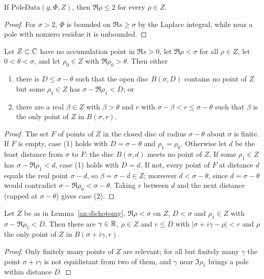 \begin{lemma}\label{an:pole-re-le}
If $\mathrm{PoleData}(g,\Phi,Z)$, then $\Re\rho\le2$ for every $\rho\in Z$.
\end{lemma}
\begin{proof}
For $\sigma>2$, $\Phi$ is bounded on $\Re s\ge\sigma$ by the Laplace
integral, while near a pole with nonzero residue it is unbounded.
\end{proof}

\begin{lemma}[Dichotomy]\label{an:dichotomy}
Let $Z\subset\mathbb{C}$ have no accumulation point in $\Re s>0$, let
$\Re\rho<\sigma$ for all $\rho\in Z$, let $0<\theta<\sigma$, and let
$\rho_0\in Z$ with $\Re\rho_0>\theta$. Then either
\begin{enumerate}
\item there is $D\le\sigma-\theta$ such that the open disc $B(\sigma,D)$
contains no point of $Z$ but some $\rho_1\in Z$ has $\sigma-\Re\rho_1<D$;
or
\item there are a real $\beta\in Z$ with $\beta>\theta$ and $r$ with
$\sigma-\beta<r\le\sigma-\theta$ such that $\beta$ is the only point of
$Z$ in $B(\sigma,r)$.
\end{enumerate}
\end{lemma}
\begin{proof}
The set $F$ of points of $Z$ in the closed disc of radius
$\sigma-\theta$ about $\sigma$ is finite. If $F$ is empty, case (1)
holds with $D=\sigma-\theta$ and $\rho_1=\rho_0$. Otherwise let $d$ be the
least distance from $\sigma$ to $F$; the disc $B(\sigma,d)$ meets no point
of $Z$. If some $\rho_1\in Z$ has $\sigma-\Re\rho_1<d$, case (1) holds
with $D=d$. If not, every point of $F$ at distance $d$ equals the real
point $\sigma-d$, so $\beta=\sigma-d\in Z$; moreover $d<\sigma-\theta$,
since $d=\sigma-\theta$ would contradict $\sigma-\Re\rho_0<\sigma-\theta$.
Taking $r$ between $d$ and the next distance (capped at $\sigma-\theta$)
gives case (2).
\end{proof}

\begin{lemma}\label{an:nearest}
Let $Z$ be as in Lemma~\ref{an:dichotomy}, $\Re\rho<\sigma$ on $Z$,
$D<\sigma$ and $\rho_1\in Z$ with $\sigma-\Re\rho_1<D$. Then there are
$\gamma\in\mathbb{R}$, $\rho\in Z$ and $r\le D$ with $|\sigma+i\gamma-\rho|<r$ and
$\rho$ the only point of $Z$ in $B(\sigma+i\gamma,r)$.
\end{lemma}
\begin{proof}
Only finitely many points of $Z$ are relevant; for all but finitely many
$\gamma$ the point $\sigma+i\gamma$ is not equidistant from two of them,
and $\gamma$ near $\Im\rho_1$ brings a pole within distance $D$.
\end{proof}

